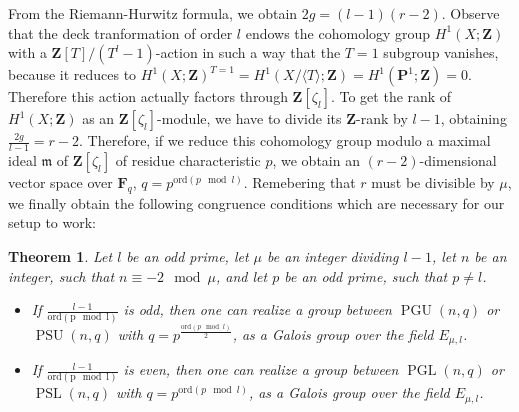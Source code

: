 \documentclass{article}
\newtheorem{theorem}{Theorem}
\theoremstyle{definition}
\DeclareMathOperator{\PGL}{\mathrm{PGL}}
\DeclareMathOperator{\PGU}{\mathrm{PGU}}
\DeclareMathOperator{\PSL}{\mathrm{PSL}}
\DeclareMathOperator{\PSU}{\mathrm{PSU}}
\begin{document}
	From the Riemann-Hurwitz formula, we obtain $2g=(l-1) (r-2)$. Observe that the deck tranformation of order $l$ endows the cohomology group $H^1(X; \mathbf{Z})$ with a $\mathbf{Z}[T]/(T^l - 1)$-action in such a way that the $T=1$ subgroup vanishes, because it reduces to $H^1(X;\mathbf{Z})^{T=1} = H^1(X / \langle T \rangle; \mathbf{Z}) = H^1(\mathbf{P}^1; \mathbf{Z}) = 0$. Therefore this action actually factors through $\mathbf{Z}[\zeta_l]$. To get the rank of $H^1(X;\mathbf{Z})$ as an $\mathbf{Z}[\zeta_l]$-module, we have to divide its $\mathbf{Z}$-rank by $l-1$, obtaining $\frac{2g}{l-1} = r - 2$. Therefore, if we reduce this cohomology group modulo a maximal ideal $\mathfrak{m}$ of $\mathbf{Z}[\zeta_l]$ of residue characteristic $p$, we obtain an $(r-2)$-dimensional vector space over $\mathbf{F}_{q}$, $q=p^{\mathrm{ord} (p \mod l)}$. Remebering that $r$ must be divisible by $\mu$, we finally obtain the following congruence conditions which are necessary for our setup to work:
	\begin{theorem} \label{main}
		Let $l$ be an odd prime, let $\mu$ be an integer dividing $l-1$, let $n$ be an integer, such that $n \equiv -2 \mod \mu$, and let $p$ be an odd prime, such that $p \neq l$.  
		\begin{itemize}
			\item If $\frac{l-1}{\mathrm{ord (p \mod l)}}$ is odd, then one can realize a group between  $\PGU(n,q)$ or $\PSU(n,q)$ with $q=p^{\frac{\mathrm{ord} (p \mod l)}{2}}$, as a Galois group over the field $E_{\mu,l}$.
			\item If $\frac{l-1}{\mathrm{ord (p \mod l)}}$ is even, then one can realize a group between  $\PGL(n,q)$ or $\PSL(n,q)$ with $q=p^{\mathrm{ord} (p \mod l)}$, as a Galois group over the field $E_{\mu,l}$.
		\end{itemize}
	\end{theorem}
\end{document}
